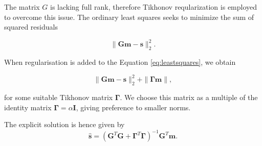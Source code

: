 \documentclass[12pt,a4paper,english]{article}
\begin{document}
The matrix $G$ is lacking full rank, therefore Tikhonov reqularization is employed to overcome this issue. The ordinary least squares seeks to minimize the sum of squared residuals

\begin{equation}
\| \mathbf{Gm}-\mathbf{s} \|_2^2.
\label{eq:leastsquares}
\end{equation}

When regularisation is added to the Equation \ref{eq:leastsquares}, we obtain

\begin{equation}
\| \mathbf{Gm}-\mathbf{s} \|_2^2 + \| \bm{\Gamma}\mathbf{m} \|, 
\label{eq:tikhonov}
\end{equation}

for some suitable Tikhonov matrix $\bm{\Gamma}$. We choose this matrix as a multiple of the identity matrix $\bm{\Gamma} = \alpha\mathbf{I}$, giving preference to smaller norms. 

The explicit solution is hence given by 
\begin{equation}
\hat{\mathbf{s}} = (\mathbf{G}^T\mathbf{G} + \bm{\Gamma}^T\bm{\Gamma})^{-1}\mathbf{G}^T\mathbf{m}.  
\end{equation}

  
   
\end{document}
